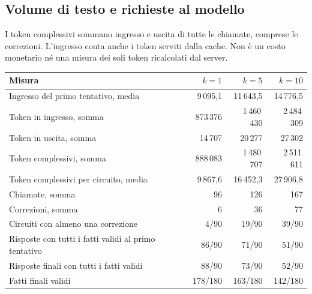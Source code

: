 \documentclass[a4paper,10pt]{article}
\begin{document}
\subsection{Volume di testo e richieste al modello}
I token complessivi sommano ingresso e uscita di tutte le chiamate, comprese
le correzioni. L'ingresso conta anche i token serviti dalla cache. Non è un
costo monetario né una misura dei soli token ricalcolati dal server.\par\begingroup\small\renewcommand{\arraystretch}{1.18}\setlength{\tabcolsep}{5pt}
\begin{tabularx}{\linewidth}{Xrrr}\toprule
Misura & $k=1$ & $k=5$ & $k=10$\\\midrule
Ingresso del primo tentativo, media & 9\,095,1 & 11\,643,5 & 14\,776,5\\
Token in ingresso, somma & 873\,376 & 1\,460\,430 & 2\,484\,309\\
Token in uscita, somma & 14\,707 & 20\,277 & 27\,302\\
Token complessivi, somma & 888\,083 & 1\,480\,707 & 2\,511\,611\\
Token complessivi per circuito, media & 9\,867,6 & 16\,452,3 & 27\,906,8\\
Chiamate, somma & 96 & 126 & 167\\
Correzioni, somma & 6 & 36 & 77\\
Circuiti con almeno una correzione & 4/90 & 19/90 & 39/90\\
Risposte con tutti i fatti validi al primo tentativo & 86/90 & 71/90 & 51/90\\
Risposte finali con tutti i fatti validi & 88/90 & 73/90 & 52/90\\
Fatti finali validi & 178/180 & 163/180 & 142/180\\
\bottomrule\end{tabularx}\endgroup\par
\end{document}

